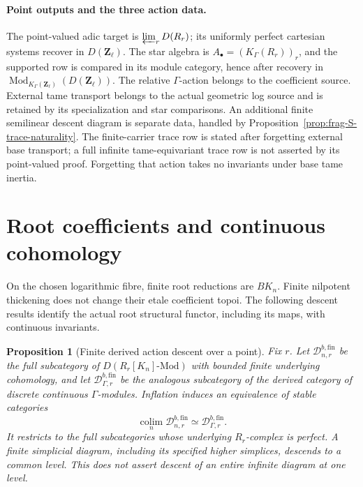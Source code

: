 \documentclass[11pt]{article}
\newtheorem{proposition}[theorem]{Proposition}
\theoremstyle{definition}
\theoremstyle{remark}
\begin{document}
\paragraph{Point outputs and the three action data.}
The point-valued adic target is $\varprojlim_r D(R_r)$; its uniformly
perfect cartesian systems recover in $D(\mathbf Z_\ell)$.
The star algebra is $A_\bullet=(K_\Gamma(R_r))_r$, and the supported
row is compared in its module category, hence after recovery in
$\operatorname{Mod}_{K_\Gamma(\mathbf Z_\ell)}(D(\mathbf Z_\ell))$.
The relative $\Gamma$-action belongs to the coefficient source.
External tame transport belongs to the actual geometric log source
and is retained by its specialization and star comparisons.
An additional finite semilinear descent diagram is separate data,
handled by Proposition~\ref{prop:frag-S-trace-naturality}.
The finite-carrier trace row is stated after forgetting external
base transport; a full infinite tame-equivariant trace row is not
asserted by its point-valued proof.  Forgetting that action takes
no invariants under base tame inertia.

\section{Root coefficients and continuous cohomology}
\label{sec:local-root-cohomology}

On the chosen logarithmic fibre, finite root reductions are $BK_n$.
Finite nilpotent thickening does not change their etale coefficient
topoi.  The following descent results identify the actual root
structural functor, including its maps, with continuous invariants.

\begin{proposition}[Finite derived action descent over a point]
\label{prop:frag-point-finite-action-descent}
Fix $r$.  Let $\mathcal D_{n,r}^{b,\mathrm{fin}}$ be the full subcategory
of $D(R_r[K_n]\text{-}\mathrm{Mod})$ with bounded finite underlying
cohomology, and let $\mathcal D_{\Gamma,r}^{b,\mathrm{fin}}$ be the analogous
subcategory of the derived category of discrete continuous $\Gamma$-modules.
Inflation induces an equivalence of stable categories
\[
\operatorname*{colim}_n\mathcal D_{n,r}^{b,\mathrm{fin}}
 \simeq\mathcal D_{\Gamma,r}^{b,\mathrm{fin}}.
\]
It restricts to the full subcategories whose underlying $R_r$-complex is
perfect.  A finite simplicial diagram, including its specified higher
simplices, descends to a common level.  This does not assert descent of
an entire infinite diagram at one level.
\end{proposition}
\end{document}

